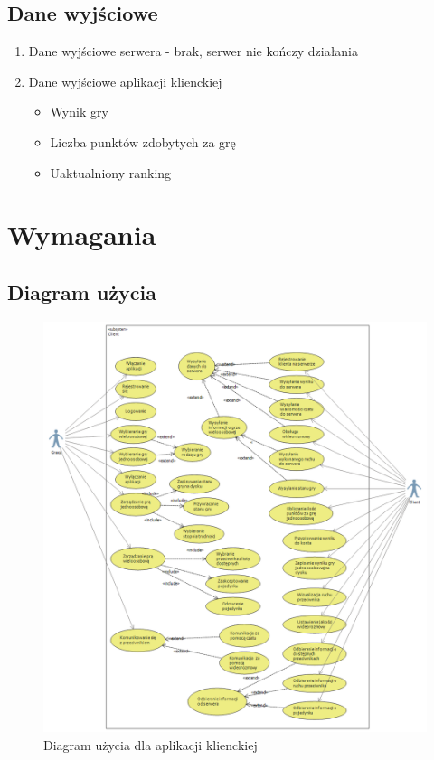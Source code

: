 \documentclass[12pt]{article}
\begin{document}
\subsection{Dane wyjściowe}
\begin{enumerate}
\item Dane wyjściowe serwera - brak, serwer nie kończy działania
\item Dane wyjściowe aplikacji klienckiej
\begin{itemize}
\item Wynik gry
\item Liczba punktów zdobytych za grę
\item Uaktualniony ranking
\end{itemize}
\end{enumerate}

\newpage

\section{Wymagania}
\subsection{Diagram użycia}

\begin{figure}[!ht]
  \centering
	\includegraphics[scale=0.5]{clientUseCase}
	 \caption{Diagram użycia dla aplikacji klienckiej}
\end{figure}
\end{document}
